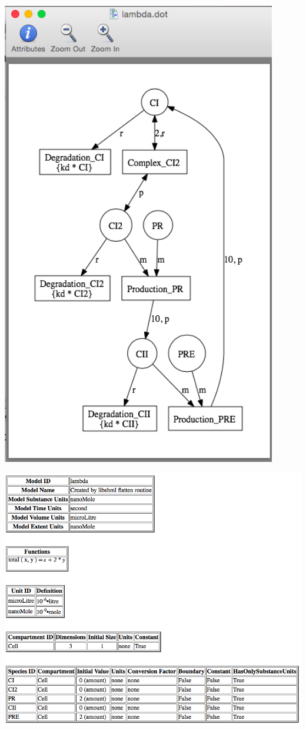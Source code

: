 \documentclass[titlepage,11pt]{article}
\begin{document}
\begin{center}
\includegraphics[width=120mm]{screenshots/viewNetwork}
\end{center}

\begin{center}
\includegraphics[width=160mm]{screenshots/viewBrowser}
\end{center}
\end{document}
